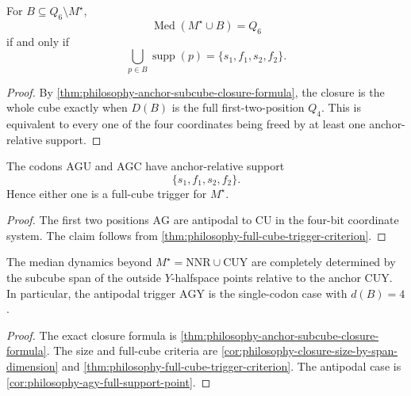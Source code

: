 \begin{theorem}
\label{thm:philosophy-full-cube-trigger-criterion}
For $B\subseteq Q_{6}\setminus M^{\star}$,
$$
  \operatorname{Med}(M^{\star}\cup B)=Q_{6}
$$
if and only if
$$
  \bigcup_{p\in B}\operatorname{supp}(p)
  =
  \{s_{1},f_{1},s_{2},f_{2}\}.
$$
\end{theorem}
\begin{proof}
By \autoref{thm:philosophy-anchor-subcube-closure-formula}, the closure
is the whole cube exactly when $D(B)$ is the full first-two-position
$Q_{4}$. This is equivalent to every one of the four coordinates being
freed by at least one anchor-relative support.
\end{proof}

\begin{corollary}
\label{cor:philosophy-agy-full-support-point}
The codons $\mathrm{AGU}$ and $\mathrm{AGC}$ have anchor-relative
support
$$
  \{s_{1},f_{1},s_{2},f_{2}\}.
$$
Hence either one is a full-cube trigger for $M^{\star}$.
\end{corollary}
\begin{proof}
The first two positions $\mathrm{AG}$ are antipodal to $\mathrm{CU}$ in
the four-bit coordinate system. The claim follows from
\autoref{thm:philosophy-full-cube-trigger-criterion}.
\end{proof}

\begin{theorem}
\label{thm:philosophy-anchor-subcube-trigger-theorem}
The median dynamics beyond $M^{\star}=\mathrm{NNR}\cup\mathrm{CUY}$ are
completely determined by the subcube span of the outside $Y$-halfspace
points relative to the anchor $\mathrm{CUY}$. In particular, the
antipodal trigger $\mathrm{AGY}$ is the single-codon case with
$d(B)=4$.
\end{theorem}
\begin{proof}
The exact closure formula is
\autoref{thm:philosophy-anchor-subcube-closure-formula}. The size and
full-cube criteria are
\autoref{cor:philosophy-closure-size-by-span-dimension} and
\autoref{thm:philosophy-full-cube-trigger-criterion}. The antipodal
case is \autoref{cor:philosophy-agy-full-support-point}.
\end{proof}

